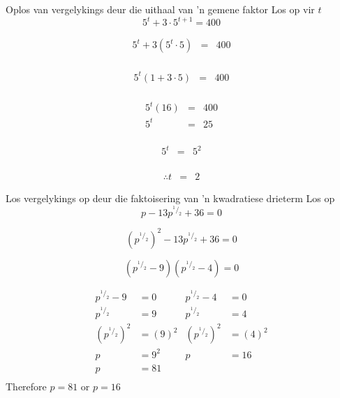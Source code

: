 


\begin{wex}
{%
Oplos van vergelykings deur die uithaal van 'n gemene faktor
}
{%
Los op vir $t$
$$ 5^t + 3 \cdot 5^{t+1} = 400 $$
}
{%

\begin{eqnarray*}
 5^t + 3 ( 5^t \cdot 5) & = & 400 \\
\end{eqnarray*}

\begin{eqnarray*}
 5^t(1 + 3 \cdot 5) & = & 400 \\
\end{eqnarray*}



\begin{eqnarray*}
 5^t(16) & = & 400 \\
  5^t & = & 25 \\
\end{eqnarray*}


\begin{eqnarray*}
  5^t & = & 5^2 \\
\end{eqnarray*}


\begin{eqnarray*}
\therefore t & = & 2
\end{eqnarray*}

}
\end{wex}

\begin{wex}
{%
Los vergelykings op deur die faktoisering van 'n kwadratiese drieterm
}
{%
Los op
$$ p-13 p^{^1/_2} + 36 =  0$$
}
{ %


$$ (p^{^1/_2})^2 -13p^{^1/_2} + 36 = 0 $$


$$ (p^{^1/_2} -9)(p^{^1/_2}-4) = 0 $$


\begin{align*}
p^{^1/_2} - 9 &= 0			&   p^{^1/_2} - 4 &= 0		\\
p^{^1/_2} &= 9				&   p^{^1/_2} &= 4		\\		
(p^{^1/_2})^2 &= (9)^2			&   (p^{^1/_2})^2 &= (4)^2\\
p &= 9^2				&   p &= 16\\
p &= 81					&\\
\end{align*} 
Therefore $p=81$ or $p=16$


}
\end{wex}


